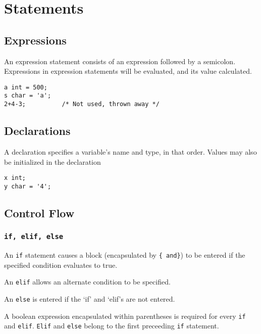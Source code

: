 \chapter{Statements}

    \section{Expressions}
        An expression statement consists of an expression followed by a semicolon. Expressions in expression statements will be evaluated, and its value calculated.

        \begin{lstlisting}
a int = 500;
s char = 'a';
2+4-3;          /* Not used, thrown away */
        \end{lstlisting}


    \section{Declarations}
        A declaration specifies a variable's name and type, in that order. Values may also be initialized in the declaration

        \begin{lstlisting}
x int;
y char = '4';
        \end{lstlisting}

    \section{Control Flow}

        \subsection{\texttt{if, elif, else}}
            An \texttt{if} statement causes a block (encapsulated by \texttt{\{ and\}}) to be entered if the specified condition evaluates to true.

            \vspace{5mm}
            \noindent An \texttt{elif} allows an alternate condition to be specified.
            
            \vspace{5mm}
            \noindent An \texttt{else} is entered if the `if' and `elif's are not entered. 
           
           \vspace{5mm}
            \noindent A boolean expression encapsulated within parentheses is required for every \texttt{if} and \texttt{elif}. \texttt{Elif} and \texttt{else} belong to the first preceeding \texttt{if} statement. 


